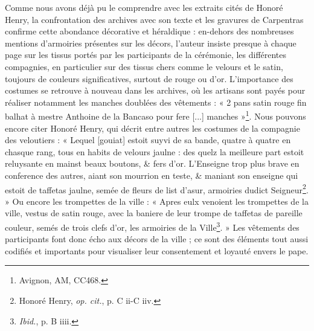 \documentclass[12pt,twoside,openany]{book}
\begin{document}
Comme nous avons déjà pu le comprendre avec les extraits cités de Honoré Henry, la confrontation des archives avec son texte et les gravures de Carpentras confirme cette abondance décorative et héraldique : en-dehors des nombreuses mentions d’armoiries présentes sur les décors, l’auteur insiste presque à chaque page sur les tissus portés par les participants de la cérémonie, les différentes compagnies, en particulier sur des tissus chers comme le velours et le satin, toujours de couleurs significatives, surtout de rouge ou d’or. L’importance des costumes se retrouve à nouveau dans les archives, où les artisans sont payés pour réaliser notamment les manches doublées des vêtements : « 2 pans satin rouge fin balhat à mestre Anthoine de la Bancaso pour fere [...] manches »\footnote{Avignon, AM, CC468.}. Nous pouvons encore citer Honoré Henry, qui décrit entre autres les costumes de la compagnie des veloutiers : « Lequel [gouiat] estoit suyvi de sa bande, quatre à quatre en chasque rang, tous en habits de velours jaulne : des quelz la meilleure part estoit reluysante en mainst beaux boutons, \& fers d’or. L’Enseigne trop plus brave en conference des autres, aiant son mourrion en teste, \& maniant son enseigne qui estoit de taffetas jaulne, semée de fleurs de list d’asur, armoiries dudict Seigneur\footnote{Honoré Henry, \textit{op. cit.}, p. C ii-C iiv.}. » Ou encore les trompettes de la ville : « Apres eulx venoient les trompettes de la ville, vestus de satin rouge, avec la baniere de leur trompe de taffetas de pareille couleur, semés de trois clefs d’or, les armoiries de la Ville\footnote{\textit{Ibid.}, p. B iiii.}. » Les vêtements des participants font donc écho aux décors de la ville ; ce sont des éléments tout aussi codifiés et importants pour visualiser leur consentement et loyauté envers le pape.
\end{document}
